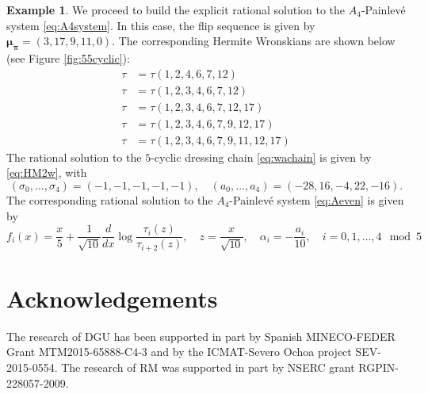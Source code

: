 \documentclass{amsart}
\theoremstyle{definition}
\newtheorem*{example}{Example} %
\newcommand{\bmu}{{\boldsymbol{\mu}}}
\newcommand{\bpi}{{\boldsymbol{\pi}}}
\begin{document}
\begin{example}
We proceed to build the explicit rational solution to the
$A_4$-Painlev\'e system \eqref{eq:A4system}. In this case, the flip
sequence is given by $\bmu_\bpi=(3,17,9,11,0)$. The corresponding
Hermite Wronskians are shown below (see Figure \ref{fig:55cyclic}):
\begin{align*}
\tau&=\tau(1,2,4,6,7,{12})\\
\tau&=\tau(1,2,3,4,6,7,{12})\\
\tau&=\tau(1,2,3,4,6,7,{12},{17})\\
\tau&=\tau(1,2,3,4,6,7,9,{12},{17})\\
\tau&=\tau(1,2,3,4,6,7,9,{11},{12},{17})
\end{align*}
The rational solution to the $5$-cyclic dressing chain
\eqref{eq:wachain} is given by \eqref{eq:HM2w}, with
\[ (\sigma_0,\ldots, \sigma_4) = (-1,-1,-1,-1,-1),\quad (a_0,\ldots,
  a_4) =(-28,16,-4,22,-16).\] The corresponding rational solution to
the $A_4$-Painlev\'e system \eqref{eq:Aeven} is given by
\[
  f_i(x) =\frac{x}{5} +\frac{1}{\sqrt{10}}
  \frac{d}{dx} \log \frac{\tau_{i}(z)}{\tau_{i+2}(z)} ,\quad z=
  \frac{x}{\sqrt{10}},\quad \alpha_i = -\frac{a_i}{10},\quad
  i=0,1,\ldots, 4 \mod 5
\]



\end{example}



\section*{Acknowledgements}
The research of DGU has been supported in part by Spanish MINECO-FEDER
Grant MTM2015-65888-C4-3 and by the ICMAT-Severo Ochoa project
SEV-2015-0554. The research of RM was supported in part by NSERC grant
RGPIN-228057-2009. 

\strut\hfill

\end{document}
